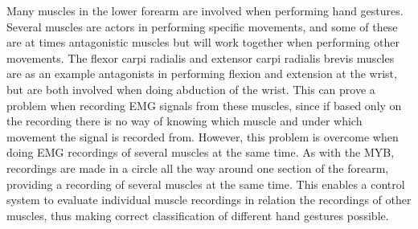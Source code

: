 Many muscles in the lower forearm are involved when performing hand gestures. Several muscles are actors in performing specific movements, and some of these are at times antagonistic muscles but will work together when performing other movements. The flexor carpi radialis and extensor carpi radialis brevis muscles are as an example antagonists in performing flexion and extension at the wrist, but are both involved when doing abduction of the wrist. \cite{Martini2012} This can prove a problem when recording EMG signals from these muscles, since if based only on the recording there is no way of knowing which muscle and under which movement the signal is recorded from. However, this problem is overcome when doing EMG recordings of several muscles at the same time. As with the MYB, recordings are made in a circle all the way around one section of the forearm, providing a recording of several muscles at the same time. This enables a control system to evaluate individual muscle recordings in relation the recordings of other muscles, thus making correct classification of different hand gestures possible. \cite{Mendez2017}


%




